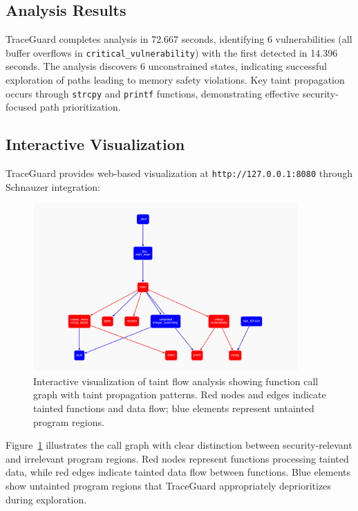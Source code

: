 \subsection{Analysis Results}

TraceGuard completes analysis in 72.667 seconds, identifying 6 vulnerabilities (all buffer overflows in \texttt{critical\_vulnerability}) with the first detected in 14.396 seconds. The analysis discovers 6 unconstrained states, indicating successful exploration of paths leading to memory safety violations. Key taint propagation occurs through \texttt{strcpy} and \texttt{printf} functions, demonstrating effective security-focused path prioritization.

\subsection{Interactive Visualization}

TraceGuard provides web-based visualization at \texttt{http://127.0.0.1:8080} through Schnauzer integration:

\begin{figure}[htbp]
    \centering
    \includegraphics[width=0.9\textwidth]{Figures/test_state_explosion_visualization.png}
    \caption{Interactive visualization of taint flow analysis showing function call graph with taint propagation patterns. Red nodes and edges indicate tainted functions and data flow; blue elements represent untainted program regions.}
    \label{fig:test_state_explosion_visualization}
\end{figure}

Figure~\ref{fig:test_state_explosion_visualization} illustrates the call graph with clear distinction between security-relevant and irrelevant program regions. Red nodes represent functions processing tainted data, while red edges indicate tainted data flow between functions. Blue elements show untainted program regions that TraceGuard appropriately deprioritizes during exploration.
